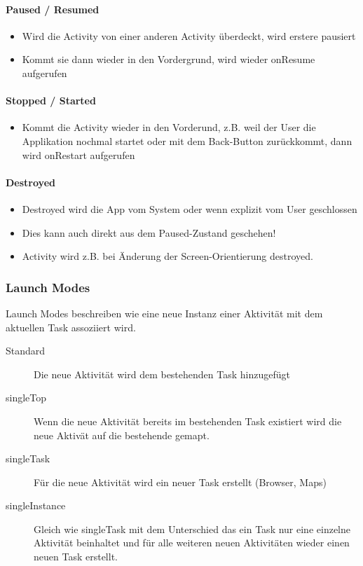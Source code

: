 \paragraph{Paused / Resumed}
\begin{itemize}
	\item Wird die Activity von einer anderen Activity überdeckt, wird erstere pausiert
	\item Kommt sie dann wieder in den Vordergrund, wird wieder onResume aufgerufen
\end{itemize}

\paragraph{Stopped / Started}
\begin{itemize}
	\item Kommt die Activity wieder in den Vorderund, z.B. weil der User die Applikation
	nochmal startet oder mit dem Back-Button zurückkommt, dann wird onRestart
	aufgerufen
\end{itemize}

\paragraph{Destroyed}
\begin{itemize}
	\item Destroyed wird die App vom System oder wenn explizit vom User geschlossen
	\item Dies kann auch direkt aus dem Paused-Zustand geschehen!
	\item Activity wird z.B. bei Änderung der Screen-Orientierung destroyed.
\end{itemize}


\subsubsection{Launch Modes}
Launch Modes beschreiben wie eine neue Instanz einer Aktivität mit dem aktuellen Task assoziiert wird.
\begin{description}
	\item[Standard] Die neue Aktivität wird dem bestehenden Task hinzugefügt
	\item[singleTop] Wenn die neue Aktivität bereits im bestehenden Task existiert wird die neue Aktivät auf die bestehende gemapt.
	\item[singleTask] Für die neue Aktivität wird ein neuer Task erstellt (Browser, Maps)
	\item[singleInstance] Gleich wie singleTask mit dem Unterschied das ein Task nur eine einzelne Aktivität beinhaltet und für alle weiteren neuen Aktivitäten wieder einen neuen Task erstellt.
\end{description}

